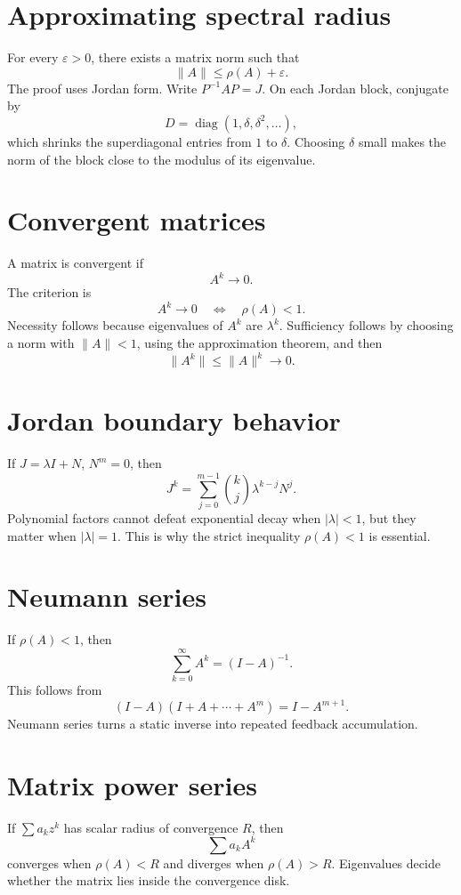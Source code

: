 \section{Approximating spectral radius}

For every \(\varepsilon>0\), there exists a matrix norm such that
\[
  \|A\|\le \rho(A)+\varepsilon.
\]
The proof uses Jordan form.  Write \(P^{-1}AP=J\).  On each Jordan block, conjugate by
\[
  D=\operatorname{diag}(1,\delta,\delta^2,\ldots),
\]
which shrinks the superdiagonal entries from \(1\) to \(\delta\).  Choosing \(\delta\) small makes the norm of the block close to the modulus of its eigenvalue.

\section{Convergent matrices}

A matrix is convergent if
\[
  A^k\to0.
\]
The criterion is
\[
  A^k\to0\quad\Longleftrightarrow\quad \rho(A)<1.
\]
Necessity follows because eigenvalues of \(A^k\) are \(\lambda^k\).  Sufficiency follows by choosing a norm with \(\|A\|<1\), using the approximation theorem, and then
\[
  \|A^k\|\le \|A\|^k\to0.
\]

\section{Jordan boundary behavior}

If \(J=\lambda I+N\), \(N^m=0\), then
\[
  J^k=\sum_{j=0}^{m-1}\binom{k}{j}\lambda^{k-j}N^j.
\]
Polynomial factors cannot defeat exponential decay when \(|\lambda|<1\), but they matter when \(|\lambda|=1\).  This is why the strict inequality \(\rho(A)<1\) is essential.

\section{Neumann series}

If \(\rho(A)<1\), then
\[
  \sum_{k=0}^\infty A^k=(I-A)^{-1}.
\]
This follows from
\[
  (I-A)(I+A+\cdots+A^m)=I-A^{m+1}.
\]
Neumann series turns a static inverse into repeated feedback accumulation.

\section{Matrix power series}

If \(\sum a_k z^k\) has scalar radius of convergence \(R\), then
\[
  \sum a_k A^k
\]
converges when \(\rho(A)<R\) and diverges when \(\rho(A)>R\).  Eigenvalues decide whether the matrix lies inside the convergence disk.

